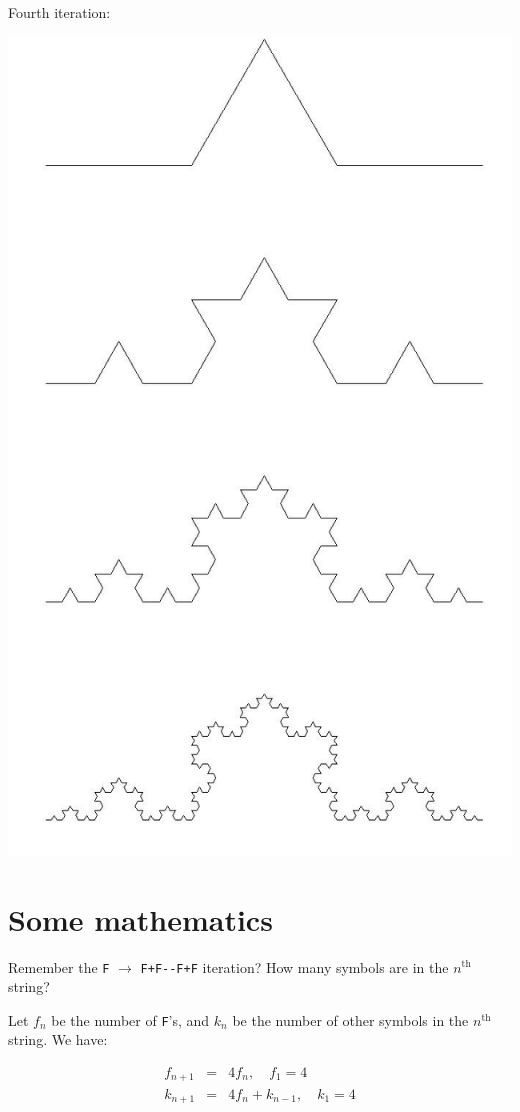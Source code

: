 \documentclass[bigger]{beamer}
\begin{document}
Fourth iteration:~
\begin{center}
\includegraphics[width=.9\linewidth]{./koch_snowflake.jpg}
\end{center}

\section*{Some mathematics}
\label{sec:orge5165d4}

Remember the \texttt{F} \(\rightarrow\) \texttt{F+F-{}-F+F} iteration?  How many symbols 
are in the \(n^{\text{th}}\) string?

Let \(f_n\) be the number of \texttt{F}'s, and \(k_n\) be the number of other
symbols in the \(n^{\text{th}}\) string. We have:

\begin{eqnarray*}
f_{n+1}&=&4f_n,\quad f_1=4\\
k_{n+1}&=&4f_n+k_{n-1},\quad k_1=4
\end{eqnarray*}
\end{document}
